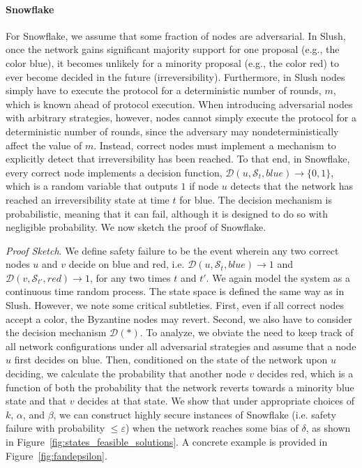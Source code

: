 \documentclass[letterpaper,twocolumn,10pt]{article}
\theoremstyle{definition}
\begin{document}
\paragraph{Snowflake} 
For Snowflake, we assume that some fraction of nodes are adversarial. In Slush, once the network gains significant majority support for one proposal (e.g., the color blue), it becomes unlikely for a minority proposal (e.g., the color red) to ever become decided in the future (irreversibility). Furthermore, in Slush nodes simply have to execute the protocol for a deterministic number of rounds, $m$, which is known ahead of protocol execution. When introducing adversarial nodes with arbitrary strategies, however, nodes cannot simply execute the protocol for a deterministic number of rounds, since the adversary may nondeterministically affect the value of $m$. Instead, correct nodes must implement a mechanism to explicitly detect that irreversibility has been reached. To that end, in Snowflake, every correct node implements a decision function, $\mathcal{D}(u, \mathcal{S}_t, blue) \rightarrow \{0, 1\}$, which is a random variable that outputs $1$ if node $u$ detects that the network has reached an irreversibility state at time $t$ for blue. The decision mechanism is probabilistic, meaning that it can fail, although it is designed to do so with negligible probability. We now sketch the proof of Snowflake.

\noindent \emph{Proof Sketch}. We define safety failure to be the event wherein any two correct nodes $u$ and $v$ decide on blue and red, i.e. $\mathcal{D}(u, \mathcal{S}_t, blue) \rightarrow 1$ and $\mathcal{D}(v, \mathcal{S}_{t'}, red) \rightarrow 1$, for any two times $t$ and $t'$. We again model the system as a continuous time random process. The state space is defined the same way as in Slush. However, we note some critical subtleties. First, even if all correct nodes accept a color, the Byzantine nodes may revert. Second, we also have to consider the decision mechanism $\mathcal{D}(*)$. To analyze, we obviate the need to keep track of all network configurations under all adversarial strategies and assume that a node $u$ first decides on blue. Then, conditioned on the state of the network upon $u$ deciding, we calculate the probability that another node $v$ decides red, which is a function of both the probability that the network reverts towards a minority blue state and that $v$ decides at that state. 
We show that under appropriate choices of $k$, $\alpha$, and $\beta$, we can construct highly secure instances of Snowflake (i.e. safety failure with probability $\leq \varepsilon$) when the network reaches some bias of $\delta$, as shown in Figure~\ref{fig:states_feasible_solutions}. A concrete example is provided in Figure~\ref{fig:fandepsilon}.
\end{document}

